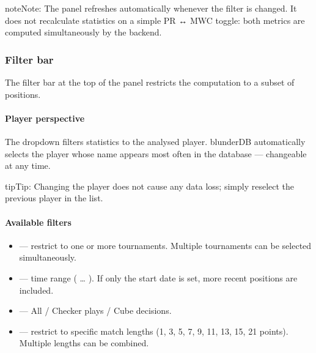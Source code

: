 \documentclass[letterpaper,10pt,english]{sphinxmanual}
\begin{document}
\begin{sphinxadmonition}{note}{Note:}
\sphinxAtStartPar
The panel refreshes automatically whenever the filter is changed. It does not recalculate statistics on a simple PR ↔ MWC toggle: both metrics are computed simultaneously by the backend.
\end{sphinxadmonition}


\subsubsection{Filter bar}
\label{\detokenize{manuel:barre-de-filtre}}
\sphinxAtStartPar
The filter bar at the top of the panel restricts the computation to a subset of positions.


\paragraph{Player perspective}
\label{\detokenize{manuel:perspective-joueur}}
\sphinxAtStartPar
The  drop\sphinxhyphen{}down filters statistics to the analysed player. blunderDB automatically selects the player whose name appears most often in the database — changeable at any time.

\begin{sphinxadmonition}{tip}{Tip:}
\sphinxAtStartPar
Changing the player does not cause any data loss; simply re\sphinxhyphen{}select the previous player in the list.
\end{sphinxadmonition}


\paragraph{Available filters}
\label{\detokenize{manuel:filtres-disponibles}}\begin{itemize}
\item {} 
\sphinxAtStartPar
{} — restrict to one or more tournaments. Multiple tournaments can be selected simultaneously.

\item {} 
\sphinxAtStartPar
{} — time range ( … ). If only the start date is set, more recent positions are included.

\item {} 
\sphinxAtStartPar
{} — All / Checker plays / Cube decisions.

\item {} 
\sphinxAtStartPar
{} — restrict to specific match lengths (1, 3, 5, 7, 9, 11, 13, 15, 21 points). Multiple lengths can be combined.

\end{itemize}
\end{document}
